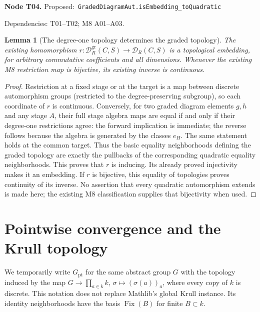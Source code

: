 \documentclass[11pt]{article}
\newtheorem{lemma}[theorem]{Lemma}
\theoremstyle{remark}\newtheorem{remark}[theorem]{Remark}
\newcommand{\Fix}{\operatorname{Fix}}
\newcommand{\D}{\mathcal D}
\newcommand{\DG}{\mathcal D^{\mathrm{gr}}}
\newcommand{\code}[1]{{\normalfont\nolinkurl{#1}}}
\newcommand{\node}[3]{\par\Needspace{8\baselineskip}\smallskip\noindent\textbf{Node #1.}\quad
 \textsf{Proposed:}\ \code{#2}\par\noindent
 \textsf{Dependencies:} #3.\par\smallskip}
\begin{document}
\node{T04}{GradedDiagramAut.isEmbedding_toQuadratic}{T01--T02; M8 A01--A03}
\begin{lemma}[The degree-one topology determines the graded topology]\label{lem:t04}
The existing homomorphism
$r:\DG_R(C,S)\to\D_R(C,S)$ is a topological embedding, for arbitrary
commutative coefficients and all dimensions. Whenever the existing
M8 restriction map is bijective, its existing inverse is continuous.
\end{lemma}
\begin{proof}
Restriction at a fixed stage or at the target is a map between discrete
automorphism groups (restricted to the degree-preserving subgroup), so
each coordinate of $r$ is continuous. Conversely, for two graded
diagram elements $g,h$ and any stage $A$, their full stage algebra maps
are equal if and only if their degree-one restrictions agree: the
forward implication is immediate; the reverse follows because the
algebra is generated by the classes $e_H$. The same statement holds
at the common target. Thus the basic equality neighborhoods defining
the graded topology are exactly the pullbacks of the corresponding
quadratic equality neighborhoods. This proves that $r$ is inducing.
Its already proved injectivity makes it an embedding. If $r$ is
bijective, this equality of topologies proves continuity of its inverse.
No assertion that every quadratic automorphism extends is made here;
the existing M8 classification supplies that bijectivity when used.
\end{proof}

\section{Pointwise convergence and the Krull topology}
\label{sec:krull}

We temporarily write $G_{\mathrm{pt}}$ for the same abstract group $G$
with the topology induced by the map $G\to\prod_{a\in k}k$,
$\sigma\mapsto(\sigma(a))_a$, where every copy of $k$ is discrete.
This notation does not replace Mathlib's global Krull instance. Its
identity neighborhoods have the basis $\Fix(B)$ for finite $B\subset k$.
\end{document}
